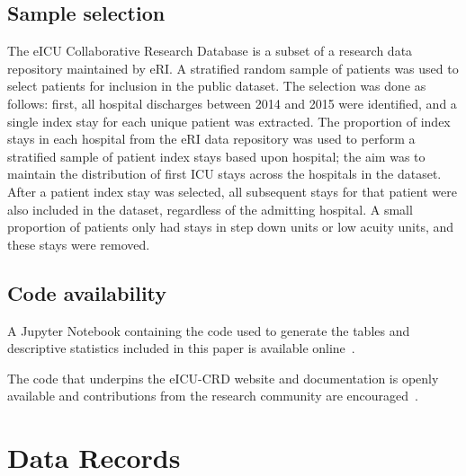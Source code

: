 \documentclass[english]{article}
\begin{document}
\subsection*{Sample selection}\label{sample-selection}

The eICU Collaborative Research Database is a subset of a research data repository maintained by eRI.
A stratified random sample of patients was used to select patients for
inclusion in the public dataset. The selection was done as follows: first, all
hospital discharges between 2014 and 2015 were identified, and a single
index stay for each unique patient was extracted. The proportion of
index stays in each hospital from the eRI data repository was used to
perform a stratified sample of patient index stays based upon hospital;
the aim was to maintain the distribution of first ICU stays across the
hospitals in the dataset. After a patient index stay was selected, all
subsequent stays for that patient were also included in the dataset,
regardless of the admitting hospital. A small proportion of patients
only had stays in step down units or low acuity units, and these stays
were removed.

\subsection*{Code availability}


A Jupyter Notebook containing the code used to generate the tables and descriptive statistics included in this paper is available online~\cite{eicu-data-paper}.

The code that underpins the eICU-CRD website and documentation is openly available and contributions from the research community are encouraged~\cite{eicu-code}.

\section*{Data Records}\label{data-records}
\end{document}
